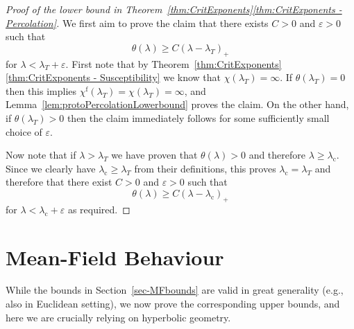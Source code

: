\documentclass[10pt,a4paper,dvipsnames]{article}
\theoremstyle{definition}
\theoremstyle{remark}
\numberwithin{equation}{section}
\begin{document}
\begin{proof}[Proof of the lower bound in Theorem~\ref{thm:CritExponents}\ref{thm:CritExponents - Percolation}]
We first aim to prove the claim that there exists $C>0$ and $\varepsilon>0$ such that
\begin{equation}
    \theta\left(\lambda\right) \geq C\left(\lambda-\lambda_T\right)_+
\end{equation}    
for $\lambda< \lambda_T+\varepsilon$. First note that by Theorem~\ref{thm:CritExponents}\ref{thm:CritExponents - Susceptibility} we know that $\chi\left(\lambda_T\right)=\infty$. If $\theta\left(\lambda_T\right)=0$ then this implies $\chi^\mathrm{f}\left(\lambda_T\right) = \chi\left(\lambda_T\right)=\infty$, and Lemma~\ref{lem:protoPercolationLowerbound} proves the claim. On the other hand, if $\theta\left(\lambda_T\right)>0$ then the claim immediately follows for some sufficiently small choice of $\varepsilon$.

Now note that if $\lambda>\lambda_T$ we have proven that $\theta\left(\lambda\right)>0$ and therefore $\lambda\geq \lambda_\mathrm{c}$. Since we clearly have $\lambda_\mathrm{c}\geq \lambda_T$ from their definitions, this proves $\lambda_\mathrm{c}=\lambda_T$ and therefore that there exist $C>0$ and $\varepsilon>0$ such that
\begin{equation}
    \theta\left(\lambda\right) \geq C\left(\lambda-\lambda_\mathrm{c}\right)_+
\end{equation}    
for $\lambda< \lambda_\mathrm{c}+\varepsilon$ as required.
\end{proof}











\section{Mean-Field Behaviour}
\label{sec:mean-field-behaviour}
While the bounds in Section~\ref{sec-MFbounds} are valid in great generality (e.g., also in Euclidean setting), we now prove the corresponding upper bounds, and here we are crucially relying on hyperbolic geometry. 
\end{document}
